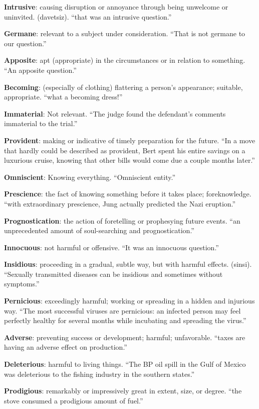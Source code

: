 \documentclass[12pt, a4paper]{ximera}
\begin{document}
\textbf{Intrusive}: causing disruption or annoyance through being unwelcome or uninvited. (davetsiz). ``that was an intrusive question.''

\textbf{Germane}: relevant to a subject under consideration. ``That is not germane to our question.''

\textbf{Apposite}: apt (appropriate) in the circumstances or in relation to something. ``An apposite question.''

\textbf{Becoming}: (especially of clothing) flattering a person's appearance; suitable, appropriate. ``what a becoming dress!''

\textbf{Immaterial}: Not relevant. ``The judge found the defendant’s comments immaterial to the trial.''

\textbf{Provident}: making or indicative of timely preparation for the future. ``In a move that hardly could be described as provident, Bert spent his entire savings on a luxurious cruise, knowing that other bills would come due a couple months later.''

\textbf{Omniscient}: Knowing everything. ``Omniscient entity.''

\textbf{Prescience}: the fact of knowing something before it takes place; foreknowledge. ``with extraordinary prescience, Jung actually predicted the Nazi eruption.'' 

\textbf{Prognostication}: the action of foretelling or prophesying future events. ``an unprecedented amount of soul-searching and prognostication.''

\textbf{Innocuous}: not harmful or offensive. ``It was an innocuous question.''

\textbf{Insidious}: proceeding in a gradual, subtle way, but with harmful effects. (sinsi). ``Sexually transmitted diseases can be insidious and sometimes without symptoms.''

\textbf{Pernicious}: exceedingly harmful; working or spreading in a hidden and injurious way. ``The most successful viruses are pernicious: an infected person may feel perfectly healthy for several months while incubating and spreading the virus.''

\textbf{Adverse}: preventing success or development; harmful; unfavorable. ``taxes are having an adverse effect on production.''

\textbf{Deleterious}: harmful to living things. ``The BP oil spill in the Gulf of Mexico was deleterious to the fishing industry in the southern states.''

\textbf{Prodigious}: remarkably or impressively great in extent, size, or degree. ``the stove consumed a prodigious amount of fuel.''
\end{document}
